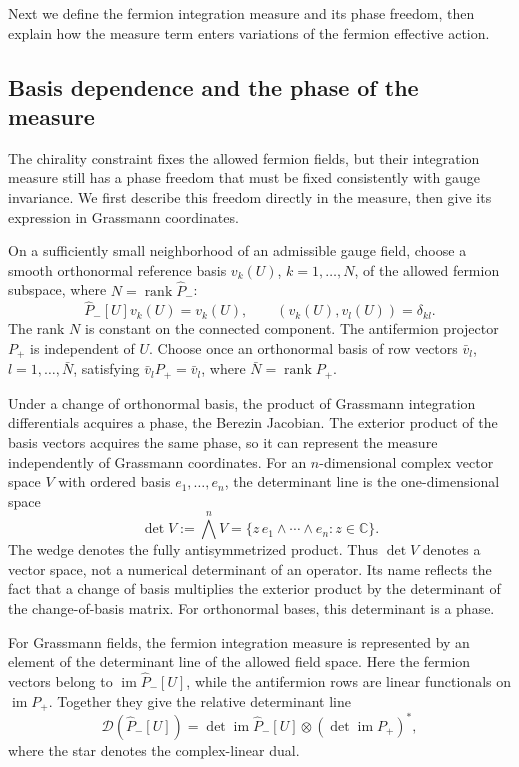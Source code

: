 \documentclass[11pt,a4paper]{article}
\theoremstyle{remark}
\DeclareMathOperator{\im}{im}
\begin{document}
Next we define the fermion integration measure and its phase
freedom, then explain how the measure term enters variations
of the fermion effective action.

\subsection{Basis dependence and the phase of the measure}

The chirality constraint fixes the allowed fermion fields,
but their integration measure still has a phase freedom
that must be fixed consistently with gauge invariance.
We first describe this freedom directly in the measure,
then give its expression in Grassmann coordinates.

On a sufficiently small neighborhood of an admissible gauge
field, choose a smooth orthonormal reference basis \(v_k(U)\),
\(k=1,\ldots,N\), of the allowed fermion subspace, where
\(N=\operatorname{rank}\widehat P_-\):
\begin{equation}
 \widehat P_-[U]v_k(U)=v_k(U),\qquad
 (v_k(U),v_l(U))=\delta_{kl}.
\end{equation}
The rank \(N\) is constant on the connected component.
The antifermion projector \(P_+\) is independent of \(U\).
Choose once an orthonormal basis of row vectors \(\bar v_l\),
\(l=1,\ldots,\bar N\), satisfying
\(\bar v_lP_+=\bar v_l\), where
\(\bar N=\operatorname{rank}P_+\).

Under a change of orthonormal basis, the product of Grassmann
integration differentials acquires a phase, the Berezin Jacobian.
The exterior product of the basis vectors acquires the same phase,
so it can represent the measure independently of Grassmann coordinates.
For an \(n\)-dimensional complex vector
space \(V\) with ordered basis
\(e_1,\ldots,e_n\), the determinant line is the
one-dimensional space
\begin{equation}
 \det V:=\bigwedge^n V
 =\{z\,e_1\wedge\cdots\wedge e_n:z\in\mathbb C\}.
\end{equation}
The wedge denotes the fully antisymmetrized product. Thus \(\det V\) denotes a
vector space, not a numerical determinant of an operator.
Its name reflects the fact that a change of basis
multiplies the exterior product by the determinant
of the change-of-basis matrix. For orthonormal bases,
this determinant is a phase.

For Grassmann fields, the fermion integration measure
is represented by an element of the determinant line
of the allowed field space. Here the fermion vectors
belong to \(\im\widehat P_-[U]\), while the antifermion
rows are linear functionals on \(\im P_+\). Together
they give the relative determinant line~\cite[sect.~6]{AdamsFamilies}
\begin{equation}
 \mathcal D(\widehat P_-[U])
 =\det\im\widehat P_-[U]\otimes(\det\im P_+)^*,
 \label{eq:measure-line}
\end{equation}
where the star denotes the complex-linear dual.
\end{document}
